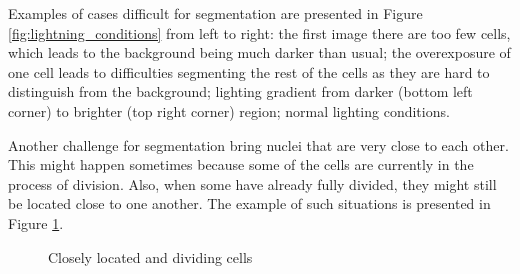 Examples of cases difficult for segmentation are presented in Figure \ref{fig:lightning_conditions} from left to right: the first image there are too few cells, which leads to the background being much darker than usual; the overexposure of one cell leads to difficulties segmenting the rest of the cells as they are hard to distinguish from the background; lighting gradient from darker (bottom left corner) to brighter (top right corner) region; normal lighting conditions.

Another challenge for segmentation bring nuclei that are very close to each other. This might happen sometimes because some of the cells are currently in the process of division. Also, when some have already fully divided, they might still be located close to one another. The example of such situations is presented in Figure \ref{fig:closely-located-cells}.

\begin{figure}[H]
    \centering
    \qquad
    \caption{Closely located and dividing cells}
    \label{fig:closely-located-cells}
\end{figure}

